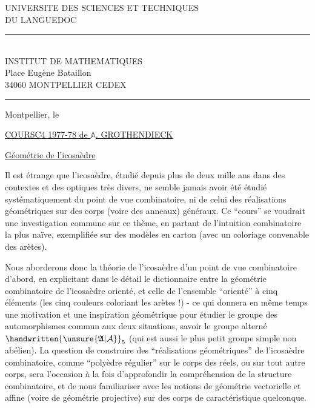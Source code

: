 \noindent\begin{minipage}[t]{0.57\linewidth}
\centering\sffamily
UNIVERSITE DES SCIENCES ET TECHNIQUES\\
DU LANGUEDOC\\
\rule{0.55cm}{0.4pt}\\
INSTITUT DE MATHEMATIQUES\\
Place Eugène Bataillon\\
34060 MONTPELLIER CEDEX\\
\rule{0.65cm}{0.4pt}
\end{minipage}\hfill
\begin{minipage}[t]{0.37\linewidth}
Montpellier, le
\end{minipage}

\begin{center}
\setlength{\ULdepth}{1.45\baselineskip}
\uline{COURS\quad C4 1977-78 de $\mathbb A$. GROTHENDIECK}\par\vspace{.6\baselineskip}
\end{center}

\uline{Géométrie de l'icosaèdre}

Il est étrange que l'icosaèdre, étudié depuis plus de deux mille ans dans des contextes et des optiques très divers, ne semble jamais avoir été étudié systématiquement du point de vue combinatoire, ni de celui des réalisations géométriques sur des corps (voire des anneaux) généraux. Ce ``cours'' se voudrait une investigation commune sur ce thème, en partant de l'intuition combinatoire la plus naïve, exemplifiée sur des modèles en carton (avec un coloriage convenable des arètes).

Nous aborderons donc la théorie de l'icosaèdre d'un point de vue combinatoire d'abord, en explicitant dans le détail le dictionnaire entre la géométrie combinatoire de l'icosaèdre orienté, et celle de l'ensemble ``orienté'' à cinq éléments (les cinq couleurs coloriant les arètes !) - ce qui donnera en même temps une motivation et une inspiration géométrique pour étudier le groupe des automorphismes commun aux deux situations, savoir le groupe alterné $\handwritten{\unsure{\mathfrak A|\mathcal A}}_5$ (qui est aussi le plus petit groupe simple non abélien). La question de construire des ``réalisations géométriques'' de l'icosaèdre combinatoire, comme ``polyèdre régulier'' sur le corps des réels, ou sur tout autre corps, sera l'occasion à la fois d'approfondir la compréhension de la structure combinatoire, et de nous familiariser avec les notions de géométrie vectorielle et affine (voire de géométrie projective) sur des corps de caractéristique quelconque.
